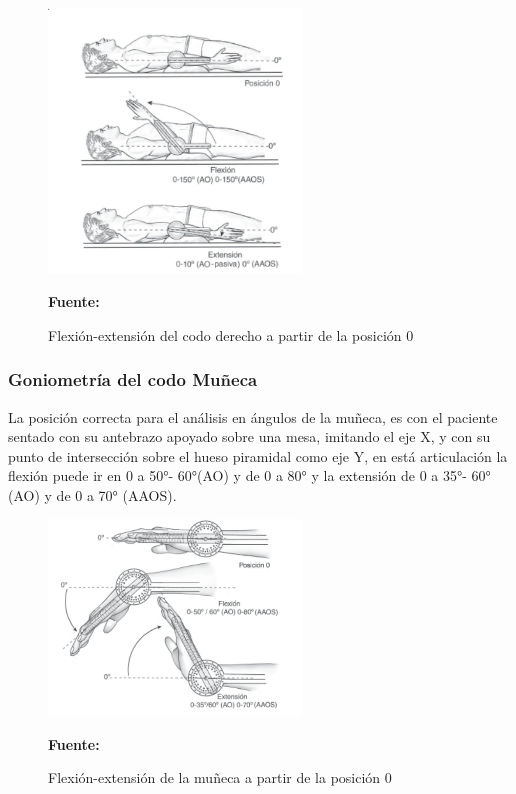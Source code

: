 
\begin{figure}[H]
    \centering
    \includegraphics[width=0.6\textwidth]{Anexos/LATEX/chapters/images/goniometria_codo.png}
    \caption{Flexión-extensión del codo derecho a partir de la posición 0}
    \small{\textbf{Fuente:} \parencite{Taboadela2007TaboadelaLaborales.} }
    \label{GONIOMETRIA_CODO}
\end{figure}

\subsubsection{Goniometría del codo Muñeca}
La posición correcta para el análisis en ángulos de la muñeca, es con el paciente sentado con su antebrazo apoyado sobre una mesa, imitando el eje X, y con su punto de intersección sobre el hueso piramidal como eje Y, en está articulación la flexión puede ir en 0 a 50°- 60°(AO) y de 0 a 80° y la extensión de 0 a 35°- 60° (AO) y de 0 a 70° (AAOS).\parencite{Taboadela2007TaboadelaLaborales.}

\begin{figure}[H]
    \centering
    \includegraphics[width=0.6\textwidth]{Anexos/LATEX/chapters/images/goniometria_muneca.png}
    \caption{Flexión-extensión de la muñeca a partir de la posición 0}
    \small{\textbf{Fuente:} \parencite{Taboadela2007TaboadelaLaborales.} }
    \label{GONIOMETRIA_MUNECA}
\end{figure}


